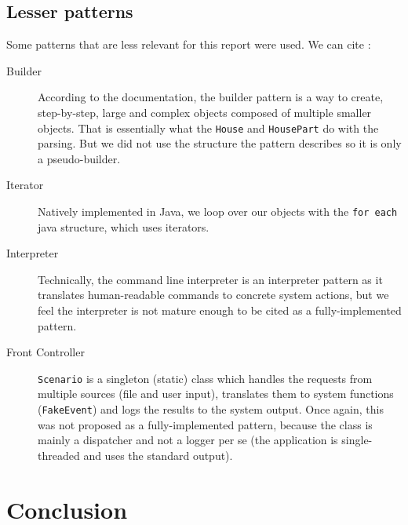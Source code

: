       \subsection{Lesser patterns}
        Some patterns that are less relevant for this report were used. We can cite :
        \begin{description}
          \item [Builder] According to the documentation, the builder pattern is a way to create, step-by-step, large and complex objects composed of multiple smaller objects. That is essentially what the \texttt{House} and \texttt{HousePart} do with the parsing. But we did not use the structure the pattern describes so it is only a pseudo-builder.
          \item [Iterator] Natively implemented in Java, we loop over our objects with the \texttt{for each} java structure, which uses iterators.
          \item [Interpreter] Technically, the command line interpreter is an interpreter pattern as it translates human-readable commands to concrete system actions, but we feel the interpreter is not mature enough to be cited as a fully-implemented pattern.
          \item [Front Controller] \texttt{Scenario} is a singleton (static) class which handles the requests from multiple sources (file and user input), translates them to system functions (\texttt{FakeEvent}) and logs the results to the system output. Once again, this was not proposed as a fully-implemented pattern, because the class is mainly a dispatcher and not a logger per se (the application is single-threaded and uses the standard output).
        \end{description}
	\section{Conclusion}

